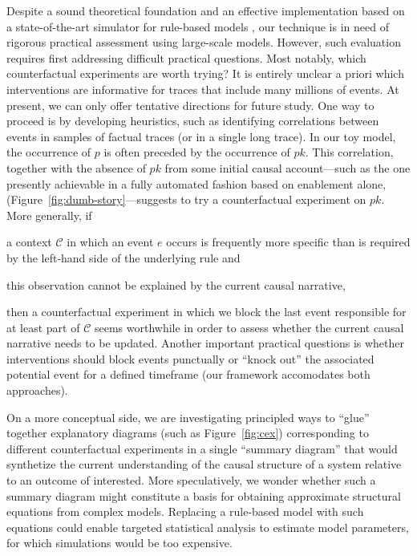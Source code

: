 Despite a sound theoretical foundation and an effective implementation
based on a state-of-the-art simulator for rule-based models
\cite{DanosEtAl-APLAS07,BoutillierEK17}, our technique is in need of
rigorous practical assessment using large-scale models. However, such
evaluation requires first addressing difficult practical
questions. Most notably, which counterfactual experiments are worth
trying? It is entirely unclear a priori which interventions are
informative for traces that include many millions of events. At
present, we can only offer tentative directions for future study. One
way to proceed is by developing heuristics, such as identifying
correlations between events in samples of factual traces (or in a
single long trace). In our toy model, the occurrence of $p$ is often
preceded by the occurrence of $pk$. This correlation, together with
the absence of $pk$ from some initial causal account---such as the one
presently achievable in a fully automated fashion based on enablement
alone, (Figure~\ref{fig:dumb-story}---suggests to try a counterfactual
experiment on $pk$. More generally, if
\begin{inparaenum}[(i)]
\item a context $\mathcal C$ in which an event $e$ occurs is
  frequently more specific than is required by the left-hand side of
  the underlying rule and
\item this observation cannot be explained by the current causal
  narrative,
\end{inparaenum} then a counterfactual experiment in which we block
the last event responsible for at least part of $\mathcal C$ seems
worthwhile in order to assess whether the current causal narrative
needs to be updated.  Another important practical questions is whether
interventions should block events punctually or ``knock out'' the
associated potential event for a defined timeframe (our framework
accomodates both approaches). 

On a more conceptual side, we are investigating principled ways to
``glue'' together explanatory diagrams (such as Figure~\ref{fig:cex})
corresponding to different counterfactual experiments in a single
``summary diagram'' that would synthetize the current understanding of
the causal structure of a system relative to an outcome of
interested. More speculatively, we wonder whether such a summary
diagram might constitute a basis for obtaining approximate structural
equations from complex models. Replacing a rule-based model with such
equations could enable targeted statistical analysis to estimate model
parameters, for which simulations would be too expensive.
